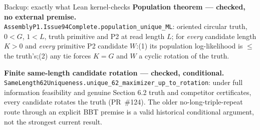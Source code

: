 \documentclass[aspectratio=169]{beamer}
\begin{document}
\begin{frame}{Backup: exactly what Lean kernel-checks}
\scriptsize
\textbf{Population theorem --- checked, no external premise.}\\
\texttt{AssemblyP1.Issue94Complete.population\_unique\_ML}: oriented circular truth, $0<G$, $1<L$, truth primitive and P2 at read length $L$; for \emph{every} candidate length $K>0$ and \emph{every} primitive P2 candidate $W$:\quad (1) its population log-likelihood is $\le$ the truth's;\quad (2) any tie forces $K=G$ and $W$ a cyclic rotation of the truth.\par\smallskip
\textbf{Finite same-length candidate rotation --- checked, conditional.}\\
\texttt{SameLength62Uniqueness.unique\_62\_maximizer\_up\_to\_rotation}:
under full information feasibility and genuine Section 6.2 truth and
competitor certificates, every candidate rotates the truth (PR~\#124).
The older no-long-triple-repeat route through an explicit BBT premise
is a valid historical conditional argument, not the strongest current
result.
\end{frame}
\end{document}
